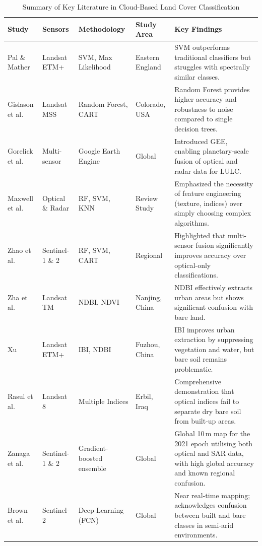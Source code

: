 \documentclass[conference]{IEEEtran}
\begin{document}
\begin{table}[!t]
\caption{Summary of Key Literature in Cloud-Based Land Cover Classification}
\label{tab_lit}
\begin{center}
\renewcommand{\arraystretch}{1.3}
\begin{tabular}{p{2.5cm}p{2.5cm}p{3cm}p{3cm}p{5cm}}
\toprule
\textbf{Study} & \textbf{Sensors} & \textbf{Methodology} & \textbf{Study Area} & \textbf{Key Findings} \\
\midrule
Pal \& Mather \cite{r7} & Landsat ETM+ & SVM, Max Likelihood & Eastern England & SVM outperforms traditional classifiers but struggles with spectrally similar classes. \\
Gislason et al. \cite{r9} & Landsat MSS & Random Forest, CART & Colorado, USA & Random Forest provides higher accuracy and robustness to noise compared to single decision trees. \\
Gorelick et al. \cite{r10} & Multi-sensor & Google Earth Engine & Global & Introduced GEE, enabling planetary-scale fusion of optical and radar data for LULC. \\
Maxwell et al. \cite{r8} & Optical \& Radar & RF, SVM, KNN & Review Study & Emphasized the necessity of feature engineering (texture, indices) over simply choosing complex algorithms. \\
Zhao et al. \cite{r3} & Sentinel-1 \& 2 & RF, SVM, CART & Regional & Highlighted that multi-sensor fusion significantly improves accuracy over optical-only classifications. \\
Zha et al. \cite{r21} & Landsat TM & NDBI, NDVI & Nanjing, China & NDBI effectively extracts urban areas but shows significant confusion with bare land. \\
Xu \cite{r23} & Landsat ETM+ & IBI, NDBI & Fuzhou, China & IBI improves urban extraction by suppressing vegetation and water, but bare soil remains problematic. \\
Rasul et al. \cite{r26} & Landsat 8 & Multiple Indices & Erbil, Iraq & Comprehensive demonstration that optical indices fail to separate dry bare soil from built-up areas. \\
Zanaga et al. \cite{r14} & Sentinel-1 \& 2 & Gradient-boosted ensemble & Global & Global 10\,m map for the 2021 epoch utilising both optical and SAR data, with high global accuracy and known regional confusion. \\
Brown et al. \cite{r15} & Sentinel-2 & Deep Learning (FCN) & Global & Near real-time mapping; acknowledges confusion between built and bare classes in semi-arid environments. \\

\end{tabular}
\end{center}
\end{table}
\end{document}
